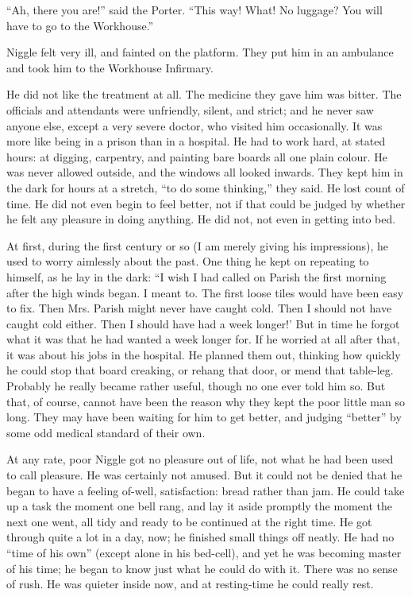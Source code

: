 \documentclass[english]{scrartcl}
\begin{document}
“Ah, there you are!” said the Porter. “This way! What! No luggage? You will have to go to the Workhouse.”

Niggle felt very ill, and fainted on the platform. They put him in an ambulance and took him to the Workhouse Infirmary.

He did not like the treatment at all. The medicine they gave him was bitter. The officials and attendants were unfriendly, silent, and strict; and he never saw anyone else, except a very severe doctor, who visited him occasionally. It was more like being in a prison than in a hospital. He had to work hard, at stated hours: at digging, carpentry, and painting bare boards all one plain colour. He was never allowed outside, and the windows all looked inwards. They kept him in the dark for hours at a stretch, “to do some thinking,” they said. He lost count of time. He did not even begin to feel better, not if that could be judged by whether he felt any pleasure in doing anything. He did not, not even in getting into bed.

At first, during the first century or so (I am merely giving his impressions), he used to worry aimlessly about the past. One thing he kept on repeating to himself, as he lay in the dark: “I wish I had called on Parish the first morning after the high winds began. I meant to. The first loose tiles would have been easy to fix. Then Mrs. Parish might never have caught cold. Then I should not have caught cold either. Then I should have had a week longer!’ But in time he forgot what it was that he had wanted a week longer for. If he worried at all after that, it was about his jobs in the hospital. He planned them out, thinking how quickly he could stop that board creaking, or rehang that door, or mend that table-leg. Probably he really became rather useful, though no one ever told him so. But that, of course, cannot have been the reason why they kept the poor little man so long. They may have been waiting for him to get better, and judging “better” by some odd medical standard of their own.

At any rate, poor Niggle got no pleasure out of life, not what he had been used to call pleasure. He was certainly not amused. But it could not be denied that he began to have a feeling of-well, satisfaction: bread rather than jam. He could take up a task the moment one bell rang, and lay it aside promptly the moment the next one went, all tidy and ready to be continued at the right time. He got through quite a lot in a day, now; he finished small things off neatly. He had no “time of his own” (except alone in his bed-cell), and yet he was becoming master of his time; he began to know just what he could do with it. There was no sense of rush. He was quieter inside now, and at resting-time he could really rest.
\end{document}

